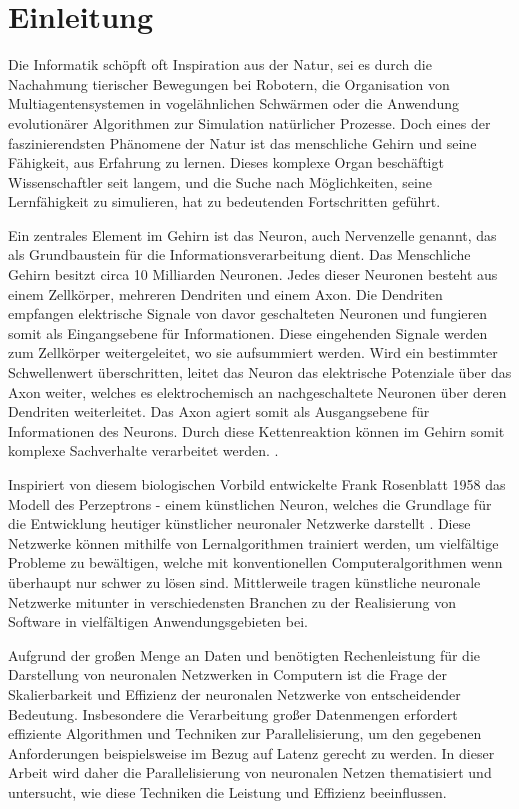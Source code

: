\chapter{Einleitung}
\label{ch:Einleitung}

Die Informatik schöpft oft Inspiration aus der Natur, sei es durch die Nachahmung tierischer Bewegungen bei Robotern, die Organisation von Multiagentensystemen in vogelähnlichen Schwärmen oder die Anwendung evolutionärer Algorithmen zur Simulation natürlicher Prozesse. Doch eines der faszinierendsten Phänomene der Natur ist das menschliche Gehirn und seine Fähigkeit, aus Erfahrung zu lernen. Dieses komplexe Organ beschäftigt Wissenschaftler seit langem, und die Suche nach Möglichkeiten, seine Lernfähigkeit zu simulieren, hat zu bedeutenden Fortschritten geführt.

Ein zentrales Element im Gehirn ist das Neuron, auch Nervenzelle genannt, das als Grundbaustein für die Informationsverarbeitung dient. Das Menschliche Gehirn besitzt circa 10 Milliarden Neuronen. Jedes dieser Neuronen besteht aus einem Zellkörper, mehreren Dendriten und einem Axon. Die Dendriten empfangen elektrische Signale von davor geschalteten Neuronen und fungieren somit als Eingangsebene für Informationen. Diese eingehenden Signale werden zum Zellkörper weitergeleitet, wo sie aufsummiert werden. Wird ein bestimmter Schwellenwert überschritten, leitet das Neuron das elektrische Potenziale über das Axon weiter, welches es elektrochemisch an nachgeschaltete Neuronen über deren Dendriten weiterleitet. Das Axon agiert somit als Ausgangsebene für Informationen des Neurons. 
Durch diese Kettenreaktion können im Gehirn somit komplexe Sachverhalte verarbeitet werden. \citep{Praktische_Einfuhrung_in_neuronale_Netze}.

Inspiriert von diesem biologischen Vorbild entwickelte Frank Rosenblatt 1958 das Modell des Perzeptrons - einem künstlichen Neuron, welches die Grundlage für die Entwicklung heutiger künstlicher neuronaler Netzwerke darstellt \citep{Rosenblatt_Perceptron}. Diese Netzwerke können mithilfe von Lernalgorithmen trainiert werden, um vielfältige Probleme zu bewältigen, welche mit konventionellen Computeralgorithmen wenn überhaupt nur schwer zu lösen sind. Mittlerweile tragen künstliche neuronale Netzwerke mitunter in verschiedensten Branchen zu der Realisierung von Software in vielfältigen Anwendungsgebieten bei.

Aufgrund der großen Menge an Daten und benötigten Rechenleistung für die Darstellung von neuronalen Netzwerken in Computern ist die Frage der Skalierbarkeit und Effizienz der neuronalen Netzwerke von entscheidender Bedeutung. Insbesondere die Verarbeitung großer Datenmengen erfordert effiziente Algorithmen und Techniken zur Parallelisierung, um den gegebenen Anforderungen beispielsweise im Bezug auf Latenz gerecht zu werden. In dieser Arbeit wird daher die Parallelisierung von neuronalen Netzen thematisiert und untersucht, wie diese Techniken die Leistung und Effizienz beeinflussen.

